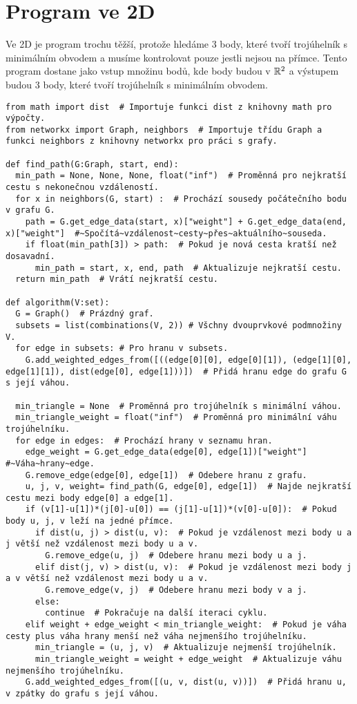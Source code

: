 \section{Program ve 2D}
\label{sec:program_2D}

Ve 2D je program trochu těžší, protože hledáme 3 body, které tvoří trojúhelník s minimálním obvodem a musíme kontrolovat pouze jestli nejsou na přímce. Tento program dostane jako vstup množinu bodů, kde body budou v $\mathbb{R}^2$ a výstupem budou 3 body, které tvoří trojúhelník s minimálním obvodem. 
\begin{mdframed}[style=MyFrame]
\begin{lstlisting}[style=metoo]
from math import dist  # Importuje funkci dist z knihovny math pro výpočty.
from networkx import Graph, neighbors  # Importuje třídu Graph a funkci neighbors z knihovny networkx pro práci s grafy.

def find_path(G:Graph, start, end):
  min_path = None, None, None, float("inf")  # Proměnná pro nejkratší cestu s nekonečnou vzdáleností.
  for x in neighbors(G, start) :  # Prochází sousedy počátečního bodu v grafu G.
    path = G.get_edge_data(start, x)["weight"] + G.get_edge_data(end, x)["weight"]  #~Spočítá~vzdálenost~cesty~přes~aktuálního~souseda.
    if float(min_path[3]) > path:  # Pokud je nová cesta kratší než dosavadní.
      min_path = start, x, end, path  # Aktualizuje nejkratší cestu.
  return min_path  # Vrátí nejkratší cestu.

def algorithm(V:set):
  G = Graph()  # Prázdný graf.
  subsets = list(combinations(V, 2)) # Všchny dvouprvkové podmnožiny V.
  for edge in subsets: # Pro hranu v subsets.
    G.add_weighted_edges_from([((edge[0][0], edge[0][1]), (edge[1][0], edge[1][1]), dist(edge[0], edge[1]))])  # Přidá hranu edge do grafu G s její váhou.

  min_triangle = None  # Proměnná pro trojúhelník s minimální váhou.
  min_triangle_weight = float("inf")  # Proměnná pro minimální váhu trojúhelníku.
  for edge in edges:  # Prochází hrany v seznamu hran.
    edge_weight = G.get_edge_data(edge[0], edge[1])["weight"]        #~Váha~hrany~edge.
    G.remove_edge(edge[0], edge[1])  # Odebere hranu z grafu.
    u, j, v, weight= find_path(G, edge[0], edge[1])  # Najde nejkratší cestu mezi body edge[0] a edge[1].
    if (v[1]-u[1])*(j[0]-u[0]) == (j[1]-u[1])*(v[0]-u[0]):  # Pokud body u, j, v leží na jedné přímce.
      if dist(u, j) > dist(u, v):  # Pokud je vzdálenost mezi body u a j větší než vzdálenost mezi body u a v.
        G.remove_edge(u, j)  # Odebere hranu mezi body u a j.
      elif dist(j, v) > dist(u, v):  # Pokud je vzdálenost mezi body j a v větší než vzdálenost mezi body u a v.
        G.remove_edge(v, j)  # Odebere hranu mezi body v a j.
      else:
        continue  # Pokračuje na další iteraci cyklu.
    elif weight + edge_weight < min_triangle_weight:  # Pokud je váha cesty plus váha hrany menší než váha nejmenšího trojúhelníku.
      min_triangle = (u, j, v)  # Aktualizuje nejmenší trojúhelník.
      min_triangle_weight = weight + edge_weight  # Aktualizuje váhu nejmenšího trojúhelníku.
    G.add_weighted_edges_from([(u, v, dist(u, v))])  # Přidá hranu u, v zpátky do grafu s její váhou.


\end{lstlisting}
\end{mdframed}
